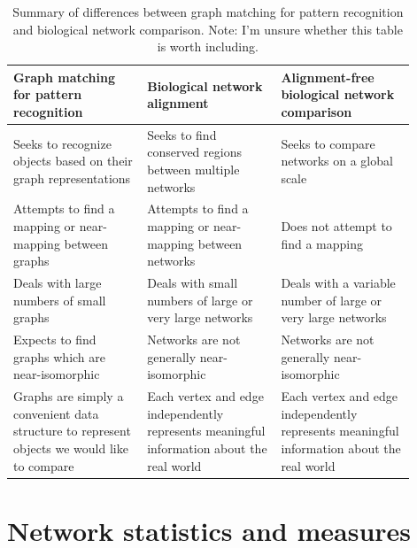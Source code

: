\documentclass[12pt]{thesis}
\theoremstyle{plain}
\theoremstyle{definition}
\theoremstyle{remark}
\begin{document}
\begin{table}[h]
\centering
\begin{tabular}[t]{L{0.3\linewidth}L{0.3\linewidth}L{0.3\linewidth}}
\textbf{Graph matching for pattern recognition} & \textbf{Biological network alignment} & \textbf{Alignment-free biological network comparison} \\ \hline\hline \noalign{\medskip}
Seeks to recognize objects based on their graph representations & Seeks to find conserved regions between multiple networks & Seeks to compare networks on a global scale \\\noalign{\medskip}
Attempts to find a mapping or near-mapping between graphs & Attempts to find a mapping or near-mapping between networks & Does not attempt to find a mapping \\\noalign{\medskip}
Deals with large numbers of small graphs & Deals with small numbers of large or very large networks & Deals with a variable number of large or very large networks \\\noalign{\medskip}
Expects to find graphs which are near-isomorphic & Networks are not generally near-isomorphic & Networks are not generally near-isomorphic \\\noalign{\medskip}
Graphs are simply a convenient data structure to represent objects we would like to compare & Each vertex and edge independently represents meaningful information about the real world & Each vertex and edge independently represents meaningful information about the real world\\
\end{tabular}
\caption{Summary of differences between graph matching for pattern recognition and biological network comparison. Note: I'm unsure whether this table is worth including.}
\label{tab:bio_vs_CS_summary}
\end{table}








\section{Network statistics and measures}
\end{document}
